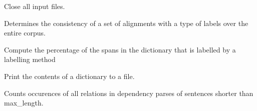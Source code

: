\documentclass[letterpaper,10pt,english]{sphinxmanual}
\begin{document}
\begin{fulllineitems}
\begin{fulllineitems}
\end{fulllineitems}


\begin{fulllineitems}
\label{file_processing:file_processing.ProcessDependencies.close_all}
Close all input files.

\end{fulllineitems}


\begin{fulllineitems}
\label{file_processing:file_processing.ProcessDependencies.consistent_labels}
Determines the consistency of a set of alignments with a type of labels
over the entire corpus.

\end{fulllineitems}


\begin{fulllineitems}
\label{file_processing:file_processing.ProcessDependencies.percentage_labelled}
Compute the percentage of the spans in the dictionary
that is labelled by a labelling method

\end{fulllineitems}


\begin{fulllineitems}
\label{file_processing:file_processing.ProcessDependencies.print_dict}
Print the contents of a dictionary
to a file.

\end{fulllineitems}


\begin{fulllineitems}
\label{file_processing:file_processing.ProcessDependencies.relation_count}
Counts occurences of all relations in dependency
parses of sentences shorter than max\_length.


\end{fulllineitems}
\end{fulllineitems}
\end{document}
